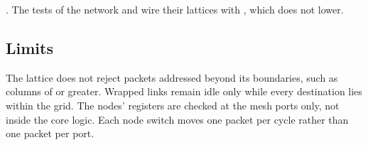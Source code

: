 . The tests of the network and  wire their
lattices with , which does not lower.

\subsection*{Limits}

The lattice does not reject packets addressed beyond its boundaries,
such as columns of  or greater. Wrapped links remain idle only
while every destination lies within the grid. The nodes' registers are
checked at the mesh ports only, not inside the core logic. Each node
switch moves one packet per cycle rather than one packet per port.
